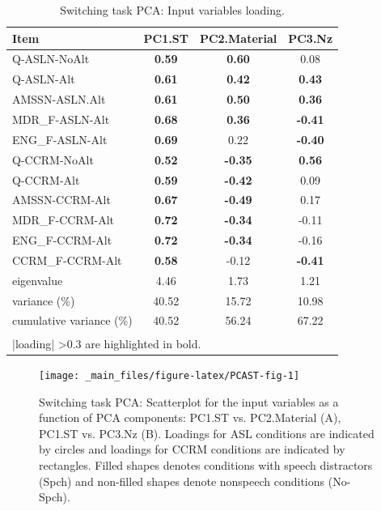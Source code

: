 \documentclass[a4paper, twoside]{templates/ociamthesis}
\begin{document}
\begin{table}

\caption{\label{tab:PCAST-Tab}Switching task PCA: Input variables loading.}
\centering
\begin{tabular}[t]{lccc}
\toprule
Item & PC1.ST & PC2.Material & PC3.Nz\\
\midrule
Q-ASLN-NoAlt & \textbf{0.59} & \textbf{0.60} & 0.08\\
Q-ASLN-Alt & \textbf{0.61} & \textbf{0.42} & \textbf{0.43}\\
AMSSN-ASLN.Alt & \textbf{0.61} & \textbf{0.50} & \textbf{0.36}\\
MDR\_F-ASLN-Alt & \textbf{0.68} & \textbf{0.36} & \textbf{-0.41}\\
ENG\_F-ASLN-Alt & \textbf{0.69} & 0.22 & \textbf{-0.40}\\
Q-CCRM-NoAlt & \textbf{0.52} & \textbf{-0.35} & \textbf{0.56}\\
Q-CCRM-Alt & \textbf{0.59} & \textbf{-0.42} & 0.09\\
AMSSN-CCRM-Alt & \textbf{0.67} & \textbf{-0.49} & 0.17\\
MDR\_F-CCRM-Alt & \textbf{0.72} & \textbf{-0.34} & -0.11\\
ENG\_F-CCRM-Alt & \textbf{0.72} & \textbf{-0.34} & -0.16\\
CCRM\_F-CCRM-Alt & \textbf{0.58} & -0.12 & \textbf{-0.41}\\
\midrule
eigenvalue & 4.46 & 1.73 & 1.21\\
variance (\%) & 40.52 & 15.72 & 10.98\\
cumulative variance (\%) & 40.52 & 56.24 & 67.22\\
\bottomrule
\multicolumn{4}{l}{\textsuperscript{} |loading| >0.3 are highlighted in bold.}\\
\end{tabular}
\end{table}

\begin{figure}

{\centering \texttt{[image: \_main\_files/figure-latex/PCAST-fig-1]} 

}

\caption{Switching task PCA: Scatterplot for the input variables as a function of PCA components: PC1.ST vs. PC2.Material (A), PC1.ST vs. PC3.Nz (B). Loadings for ASL conditions are indicated by circles and loadings for CCRM conditions are indicated by rectangles. Filled shapes denotes conditions with speech distractors (Spch) and non-filled shapes denote nonspeech conditions (No-Spch).}\label{fig:PCAST-fig}
\end{figure}
\end{document}
